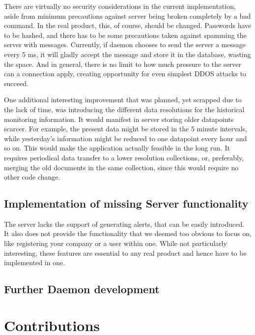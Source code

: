 \documentclass{l3proj}
\begin{document}
There are virtually no security considerations in the current implementation, aside from minimum precautions against server being broken completely by a bad command. In the real product, this, of course, should be changed. Passwords have to be hashed, and there has to be some precautions taken against spamming the server with messages. Currently, if daemon chooses to send the server a message every 5 ms, it will gladly accept the message and store it in the database, wasting the space. And in general, there is no limit to how much pressure to the server can a connection apply, creating opportunity for even simplest DDOS attacks to succeed. 

One additional interesting improvement that was planned, yet scrapped due to the lack of time, was introducing the different data resolutions for the historical monitoring information. It would manifest in server storing older datapoints scarcer. For example, the present data might be stored in the 5 minute intervals, while yesterday's information might be reduced to one datapoint every hour and so on. This would make the application actually feasible in the long run. It requires periodical data transfer to a lower resolution collections, or, preferably, merging the old documents in the same collection, since this would require no other code change.

\subsection{Implementation of missing Server functionality}

The server lacks the support of generating alerts, that can be easily introduced. It also does not provide the functionality that we deemed too obvious to focus on, like registering your company or a user within one. While not particularly interesting, these features are essential to any real product and hence have to be implemented in one.

\subsection{Further Daemon development}


\section{Contributions}
\end{document}
